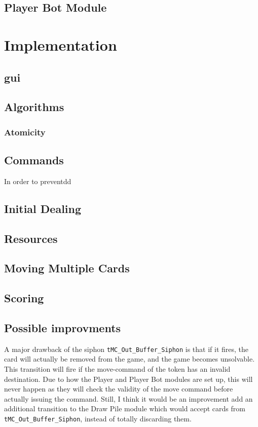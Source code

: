 \documentclass[runningheads,a4paper]{llncs}
\begin{document}
\subsection{Player Bot Module}


\section{Implementation}
\label{sec:3_implementation}
\subsection{\ac{gui}}
\label{sec:3_gui}
\subsection{Algorithms}
\subsubsection{Atomicity}
\subsection{Commands}
In order to preventdd
\subsection{Initial Dealing}
\subsection{Resources}
\label{sec:3_Resources}
\subsection{Moving Multiple Cards}
\subsection{Scoring}
\subsection{Possible improvments}
A major drawback of the siphon \verb!tMC_Out_Buffer_Siphon! is that if it fires, the card will actually be removed from the game, and the game becomes unsolvable. This transition will fire if the move-command of the token has an invalid destination. Due to how the Player and Player Bot modules are set up, this will never happen as they will check the validity of the move command before actually issuing the command. Still, I think it would be an improvement add an additional transition to the Draw Pile module which would accept cards from \verb!tMC_Out_Buffer_Siphon!, instead of totally discarding them.
\newline
\end{document}
